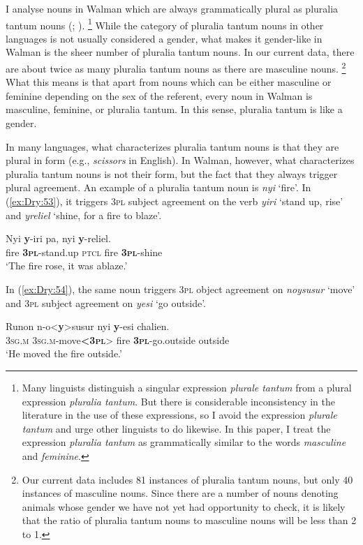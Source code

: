 \documentclass[output=collectionpaper]{langsci/langscibook}
\begin{document}
I analyse nouns in Walman which are always grammatically plural as pluralia tantum nouns (\citealt[233ff]{Corbett2012}; \citealt{Acquaviva2008}).%
\footnote{Many linguists distinguish a singular expression \textit{plurale tantum} from a plural expression \textit{pluralia tantum}. But there is considerable inconsistency in the literature in the use of these expressions, so I avoid the expression \textit{plurale tantum} and urge other linguists to do likewise. In this paper, I treat the expression \textit{pluralia tantum} as grammatically similar to the words \textit{masculine} and \textit{feminine}.} %
While the category of pluralia tantum nouns in other languages is not usually considered a gender, what makes it gender-like in Walman is the sheer number of pluralia tantum nouns. In our current data, there are about twice as many pluralia tantum nouns as there are masculine nouns.%
\footnote{Our current data includes 81 instances of pluralia tantum nouns, but only 40 instances of masculine nouns. Since there are a number of nouns denoting animals whose gender we have not yet had opportunity to check, it is likely that the ratio of pluralia tantum nouns to masculine nouns will be less than 2 to 1.} %
What this means is that apart from nouns which can be either masculine or feminine depending on the sex of the referent, every noun in Walman is masculine, feminine, or pluralia tantum. In this sense, pluralia tantum is like a gender.

In many languages, what characterizes pluralia tantum nouns is that they are plural in form (e.g., \textit{scissors} in English). In Walman, however, what characterizes pluralia tantum nouns is not their form, but the fact that they always trigger plural agreement. An example of a pluralia tantum noun is \textit{nyi} `fire'. In (\ref{ex:Dry:53}), it triggers \textsc{3pl} subject agreement on the verb \textit{yiri} `stand up, rise' and \textit{yreliel} `shine, for a fire to blaze'.

\ea \label{ex:Dry:53}
\gll Nyi	\textbf{y}-iri	pa,	nyi	\textbf{y}-reliel.\\
fire \textbf{\textsc{3pl}}-stand.up \textsc{ptcl} fire \textbf{\textsc{3pl}}-shine\\
\glt `The fire rose, it was ablaze.'
\z

In (\ref{ex:Dry:54}), the same noun triggers \textsc{3pl} object agreement on \textit{noysusur} `move' and \textsc{3pl} subject agreement on \textit{yesi} `go outside'.

\ea \label{ex:Dry:54}
\gll Runon	n-o<\textbf{y}>susur	nyi	\textbf{y}-esi	chalien.\\
\textsc{3sg.m} \textsc{3sg.m}-move\textbf{<\textsc{3pl}}> fire \textbf{\textsc{3pl}}-go.outside outside\\
\glt `He moved the fire outside.'
\z
\end{document}
